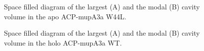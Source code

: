 \begin{singlespacing}
		\setlength\fboxsep{5pt}
		\setlength\fboxrule{1.5pt}
		\begin{figure}[htbp]
		\centering
		\caption[Space filled diagram of the largest and the modal cavity volume in the apo ACP-mupA3a W44L.]{Space filled diagram of the largest (A) and the modal (B) cavity volume in the apo ACP-mupA3a W44L.}
		\label{fig:acp_mutant}
		\end{figure}		

		\setlength\fboxsep{5pt}
		\setlength\fboxrule{1.5pt}
		\begin{figure}[htbp]
		\centering
		\caption[Space filled diagram of the largest and the modal cavity volume in the holo ACP-mupA3a WT.]{Space filled diagram of the largest (A) and the modal (B) cavity volume in the holo ACP-mupA3a WT.}
		\label{fig:ppt_wild}
		\end{figure}



\end{singlespacing}
